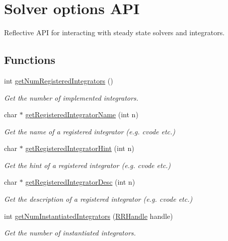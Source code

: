 \hypertarget{group__simopts}{\section{Solver options A\+P\+I}
\label{group__simopts}
}


Reflective A\+P\+I for interacting with steady state solvers and integrators.  


\subsection*{Functions}
\begin{DoxyCompactItemize}
\item 
int \hyperlink{group__simopts_ga53617fbabff8088e10c8bc5deee40353}{get\+Num\+Registered\+Integrators} ()
\begin{DoxyCompactList}\small\item\em Get the number of implemented integrators. \end{DoxyCompactList}\item 
char $\ast$ \hyperlink{group__simopts_ga5713f7cea279fc58aa497615ebb7ddbf}{get\+Registered\+Integrator\+Name} (int n)
\begin{DoxyCompactList}\small\item\em Get the name of a registered integrator (e.\+g. cvode etc.) \end{DoxyCompactList}\item 
char $\ast$ \hyperlink{group__simopts_ga6d22f11e49e89336e5d795e620e55530}{get\+Registered\+Integrator\+Hint} (int n)
\begin{DoxyCompactList}\small\item\em Get the hint of a registered integrator (e.\+g. cvode etc.) \end{DoxyCompactList}\item 
char $\ast$ \hyperlink{group__simopts_gaae54354d9935875691727e0b89e5ebc2}{get\+Registered\+Integrator\+Desc} (int n)
\begin{DoxyCompactList}\small\item\em Get the description of a registered integrator (e.\+g. cvode etc.) \end{DoxyCompactList}\item 
int \hyperlink{group__simopts_ga492555873a0da5f8aa167eeafb7d7d21}{get\+Num\+Instantiated\+Integrators} (\hyperlink{rrc__types_8h_a1d68f0592372208fa5a5f2799ea4b3ae}{R\+R\+Handle} handle)
\begin{DoxyCompactList}\small\item\em Get the number of instantiated integrators. \end{DoxyCompactList}\item 

\end{DoxyCompactItemize}
